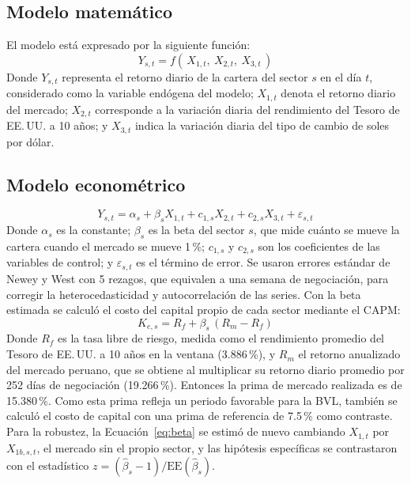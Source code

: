 \documentclass[jrfm,article,submit,oneauthor]{Definitions/mdpi}
\begin{document}
\subsection{Modelo matemático}
El modelo está expresado por la siguiente función:
\[
Y_{s,t} = f(\, X_{1,t},\ X_{2,t},\ X_{3,t} \,)
\]
\noindent Donde $Y_{s,t}$ representa el retorno diario de la cartera del sector $s$ en el día $t$, considerado como la variable endógena del modelo; $X_{1,t}$ denota el retorno diario del mercado; $X_{2,t}$ corresponde a la variación diaria del rendimiento del Tesoro de EE.\,UU. a 10 años; y $X_{3,t}$ indica la variación diaria del tipo de cambio de soles por dólar.

\subsection{Modelo econométrico}
\begin{equation}
Y_{s,t} = \alpha_s + \beta_s X_{1,t} + c_{1,s} X_{2,t} + c_{2,s} X_{3,t} + \varepsilon_{s,t}
\label{eq:beta}
\end{equation}
\noindent Donde $\alpha_s$ es la constante; $\beta_s$ es la beta del sector $s$, que mide cuánto se mueve la cartera cuando el mercado se mueve 1\,\%; $c_{1,s}$ y $c_{2,s}$ son los coeficientes de las variables de control; y $\varepsilon_{s,t}$ es el término de error. Se usaron errores estándar de Newey y West con 5 rezagos, que equivalen a una semana de negociación, para corregir la heterocedasticidad y autocorrelación de las series. Con la beta estimada se calculó el costo del capital propio de cada sector mediante el CAPM:
\begin{equation}
K_{e,s} = R_f + \beta_s \,(R_m - R_f)
\label{eq:capm}
\end{equation}
\noindent Donde $R_f$ es la tasa libre de riesgo, medida como el rendimiento promedio del Tesoro de EE.\,UU. a 10 años en la ventana (3.886\,\%), y $R_m$ el retorno anualizado del mercado peruano, que se obtiene al multiplicar su retorno diario promedio por 252 días de negociación (19.266\,\%). Entonces la prima de mercado realizada es de 15.380\,\%. Como esta prima refleja un periodo favorable para la BVL, también se calculó el costo de capital con una prima de referencia de 7.5\,\% como contraste. Para la robustez, la Ecuación~\ref{eq:beta} se estimó de nuevo cambiando $X_{1,t}$ por $X_{1b,s,t}$, el mercado sin el propio sector, y las hipótesis específicas se contrastaron con el estadístico $z = (\hat{\beta}_s - 1)/\mathrm{EE}(\hat{\beta}_s)$.
\end{document}
